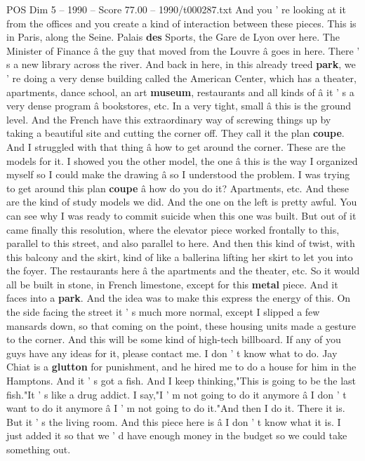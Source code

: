\begin{textsample}{POS Dim 5 – 1990 – Score 77.00 – 1990/t000287.txt}
And you ' re looking at it from the offices and you create a kind of interaction between these pieces.
This is in Paris, along the Seine.
Palais \textbf{des} Sports, the Gare de Lyon over here.
The Minister of Finance â the guy that moved from the Louvre â goes in here.
There ' s a new library across the river.
And back in here, in this already treed \textbf{park}, we ' re doing a very dense building called the American Center, which has a theater, apartments, dance school, an art \textbf{museum}, restaurants and all kinds of â it ' s a very dense program â bookstores, etc.
In a very tight, small â this is the ground level.
And the French have this extraordinary way of screwing things up by taking a beautiful site and cutting the corner off.
They call it the plan \textbf{coupe}.
And I struggled with that thing â how to get around the corner.
These are the models for it.
I showed you the other model, the one â this is the way I organized myself so I could make the drawing â so I understood the problem.
I was trying to get around this plan \textbf{coupe} â how do you do it?
Apartments, etc.
And these are the kind of study models we did.
And the one on the left is pretty awful.
You can see why I was ready to commit suicide when this one was built.
But out of it came finally this resolution, where the elevator piece worked frontally to this, parallel to this street, and also parallel to here.
And then this kind of twist, with this balcony and the skirt, kind of like a ballerina lifting her skirt to let you into the foyer.
The restaurants here â the apartments and the theater, etc.
So it would all be built in stone, in French limestone, except for this \textbf{metal} piece.
And it faces into a \textbf{park}.
And the idea was to make this express the energy of this.
On the side facing the street it ' s much more normal, except I slipped a few mansards down, so that coming on the point, these housing units made a gesture to the corner.
And this will be some kind of high-tech billboard.
If any of you guys have any ideas for it, please contact me.
I don ' t know what to do.
Jay Chiat is a \textbf{glutton} for punishment, and he hired me to do a house for him in the Hamptons.
And it ' s got a fish.
And I keep thinking,"This is going to be the last fish."It ' s like a drug addict.
I say,"I ' m not going to do it anymore â I don ' t want to do it anymore â I ' m not going to do it."And then I do it.
There it is.
But it ' s the living room.
And this piece here is â I don ' t know what it is.
I just added it so that we ' d have enough money in the budget so we could take something out.

\end{textsample}
